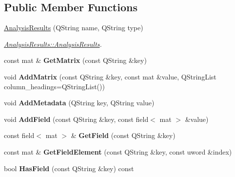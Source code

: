 \subsection*{Public Member Functions}
\begin{DoxyCompactItemize}
\item 
\hyperlink{class_analysis_results_a57948e7a68b5bf5fde4bb9b529bc74f8}{Analysis\+Results} (Q\+String name, Q\+String type)
\begin{DoxyCompactList}\small\item\em \hyperlink{class_analysis_results_a57948e7a68b5bf5fde4bb9b529bc74f8}{Analysis\+Results\+::\+Analysis\+Results}. \end{DoxyCompactList}\item 
const mat \& {\bfseries Get\+Matrix} (const Q\+String \&key)\hypertarget{class_analysis_results_a3211ec604d58c2ea34e50cd3e7c49572}{}\label{class_analysis_results_a3211ec604d58c2ea34e50cd3e7c49572}

\item 
void {\bfseries Add\+Matrix} (const Q\+String \&key, const mat \&value, Q\+String\+List column\+\_\+headings=Q\+String\+List())\hypertarget{class_analysis_results_a2349a9295a929c61c5084204145dbab4}{}\label{class_analysis_results_a2349a9295a929c61c5084204145dbab4}

\item 
void {\bfseries Add\+Metadata} (Q\+String key, Q\+String value)\hypertarget{class_analysis_results_ab35691d76d1d1f677e66d9cc13d1a519}{}\label{class_analysis_results_ab35691d76d1d1f677e66d9cc13d1a519}

\item 
void {\bfseries Add\+Field} (const Q\+String \&key, const field$<$ mat $>$ \&value)\hypertarget{class_analysis_results_a53ec2238480b31e731f92535933e8b71}{}\label{class_analysis_results_a53ec2238480b31e731f92535933e8b71}

\item 
const field$<$ mat $>$ \& {\bfseries Get\+Field} (const Q\+String \&key)\hypertarget{class_analysis_results_aa965980fdbb9951feb590b8eb4d40f44}{}\label{class_analysis_results_aa965980fdbb9951feb590b8eb4d40f44}

\item 
const mat \& {\bfseries Get\+Field\+Element} (const Q\+String \&key, const uword \&index)\hypertarget{class_analysis_results_a87e819162ca27952bf7e4393348b00c9}{}\label{class_analysis_results_a87e819162ca27952bf7e4393348b00c9}

\item 
bool {\bfseries Has\+Field} (const Q\+String \&key) const \hypertarget{class_analysis_results_adefe903488915b979a37e7fb93ae3747}{}\label{class_analysis_results_adefe903488915b979a37e7fb93ae3747}


\end{DoxyCompactItemize}
